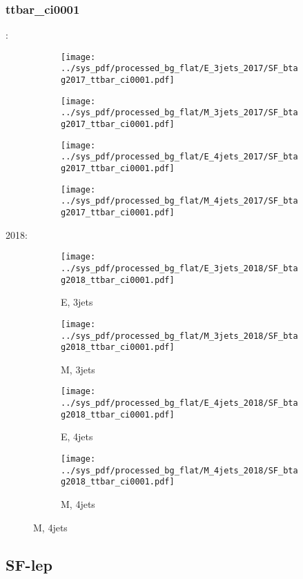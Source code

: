 \documentclass{beamer}
\begin{document}
\begin{frame}
\frametitle{ttbar_ci0001}
\fontsize{5}{1}:
\begin{figure}
\centering
\begin{subfigure}[b]{0.24\textwidth}
\texttt{[image: ../sys\_pdf/processed\_bg\_flat/E\_3jets\_2017/SF\_btag2017\_ttbar\_ci0001.pdf]}
\end{subfigure}
\begin{subfigure}[b]{0.24\textwidth}
\texttt{[image: ../sys\_pdf/processed\_bg\_flat/M\_3jets\_2017/SF\_btag2017\_ttbar\_ci0001.pdf]}
\end{subfigure}
\begin{subfigure}[b]{0.24\textwidth}
\texttt{[image: ../sys\_pdf/processed\_bg\_flat/E\_4jets\_2017/SF\_btag2017\_ttbar\_ci0001.pdf]}
\end{subfigure}
\begin{subfigure}[b]{0.24\textwidth}
\texttt{[image: ../sys\_pdf/processed\_bg\_flat/M\_4jets\_2017/SF\_btag2017\_ttbar\_ci0001.pdf]}
\end{subfigure}
\end{figure}
2018:
\begin{figure}
\centering
\begin{subfigure}[b]{0.24\textwidth}
\texttt{[image: ../sys\_pdf/processed\_bg\_flat/E\_3jets\_2018/SF\_btag2018\_ttbar\_ci0001.pdf]}
\captionsetup{font=tiny}
\caption{E, 3jets}
\end{subfigure}
\begin{subfigure}[b]{0.24\textwidth}
\texttt{[image: ../sys\_pdf/processed\_bg\_flat/M\_3jets\_2018/SF\_btag2018\_ttbar\_ci0001.pdf]}
\captionsetup{font=tiny}
\caption{M, 3jets}
\end{subfigure}
\begin{subfigure}[b]{0.24\textwidth}
\texttt{[image: ../sys\_pdf/processed\_bg\_flat/E\_4jets\_2018/SF\_btag2018\_ttbar\_ci0001.pdf]}
\captionsetup{font=tiny}
\caption{E, 4jets}
\end{subfigure}
\begin{subfigure}[b]{0.24\textwidth}
\texttt{[image: ../sys\_pdf/processed\_bg\_flat/M\_4jets\_2018/SF\_btag2018\_ttbar\_ci0001.pdf]}
\captionsetup{font=tiny}
\caption{M, 4jets}
\end{subfigure}
\end{figure}
\end{frame}


\subsection{SF-lep}
\end{document}
